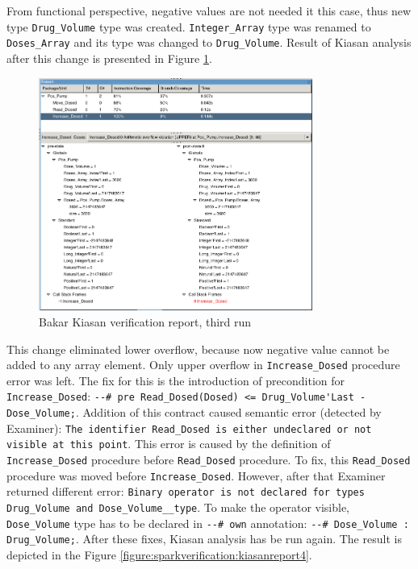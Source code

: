 From functional perspective, negative values are not needed it this case, thus new type \lstinline{Drug_Volume} type was created. \lstinline{Integer_Array} type was renamed to \lstinline{Doses_Array} and its type was changed to \lstinline{Drug_Volume}. Result of Kiasan analysis after this change is presented in Figure \ref{figure:sparkverification:kiasanreport3}.

\begin{figure}[ht]%
    \begin{center}
        \includegraphics[width=0.8\textwidth]{figures/pca-pump-verification-step3.png}        
    \end{center}
    \caption{Bakar Kiasan verification report, third run}
    \label{figure:sparkverification:kiasanreport3}
\end{figure}

This change eliminated lower overflow, because now negative value cannot be added to any array element. Only upper overflow in \lstinline{Increase_Dosed} procedure error was left. The fix for this is the introduction of precondition for \lstinline{Increase_Dosed}: \lstinline{--# pre Read_Dosed(Dosed) <= Drug_Volume'Last - Dose_Volume;}. Addition of this contract caused semantic error (detected by Examiner): \lstinline{The identifier Read_Dosed is either undeclared or not visible at this point}. This error is caused by the definition of \lstinline{Increase_Dosed} procedure before \lstinline{Read_Dosed} procedure. To fix, this \lstinline{Read_Dosed} procedure was moved before \lstinline{Increase_Dosed}. However, after that Examiner returned different error: \lstinline{Binary operator is not declared for types Drug_Volume and Dose_Volume__type}. To make the operator visible, \lstinline{Dose_Volume} type has to be declared in \lstinline{--# own} annotation: \lstinline{--# Dose_Volume : Drug_Volume;}. After these fixes, Kiasan analysis has be run again. The result is depicted in the Figure \ref{figure:sparkverification:kiasanreport4}.

